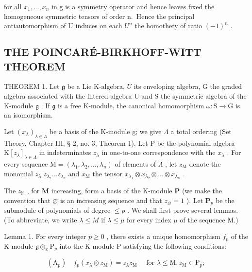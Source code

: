 for all \(x_{1},\ldots,x_{n}\) in g is a symmetry operator and hence leaves fixed the homogeneous symmetric tensors of order n.~Hence the principal antiautomorphism of U induces on each \(U^{n}\) the homothety of ratio \((-1)^{n}\) .

\subsection{THE POINCARÉ-BIRKHOFF-WITT THEOREM}

THEOREM 1. Let \(\mathfrak{g}\) be a Lie K-algebra, \(U\) its enveloping algebra, G the graded algebra associated with the filtered algebra U and S the symmetric algebra of the K-module \(\mathfrak{g}\) . If \(\mathfrak{g}\) is a free K-module, the canonical homomorphism \(\omega: \mathrm{S} \to \mathrm{G}\) is an isomorphism.

Let \((x_{\lambda})_{\lambda \in \Lambda}\) be a basis of the K-module g; we give \(\Lambda\) a total ordering (Set Theory, Chapter III, § 2, no. 3, Theorem 1). Let P be the polynomial algebra \(\mathrm{K}[z_{\lambda}]_{\lambda \in \Lambda}\) in indeterminates \(z_{\lambda}\) in one-to-one correspondence with the \(x_{\lambda}\) . For every sequence \(\mathrm{M} = (\lambda_1, \lambda_2, \ldots, \lambda_n)\) of elements of \(\Lambda\) , let \(z_{\mathrm{M}}\) denote the monomial \(z_{\lambda_1}z_{\lambda_2}\ldots z_{\lambda_n}\) and \(x_{\mathrm{M}}\) the tensor \(x_{\lambda_1}\otimes x_{\lambda_2}\otimes \dots \otimes x_{\lambda_n}\) .

The \(z_{\mathbb{M}}\) , for \(\mathbf{M}\) increasing, form a basis of the K-module \(\mathbf{P}\) (we make the convention that \(\varnothing\) is an increasing sequence and that \(z_{\varnothing} = 1\) ). Let \(\mathbf{P}_p\) be the submodule of polynomials of degree \(\leqslant p\) . We shall first prove several lemmas. (To abbreviate, we write \(\lambda \leqslant M\) if \(\lambda \leqslant \mu\) for every index \(\mu\) of the sequence M.)

Lemma 1. For every integer \(p \geqslant 0\) , there exists a unique homomorphism \(f_p\) of the K-module \(\mathfrak{g} \otimes_{\mathbb{K}} \mathrm{P}_p\) into the K-module \(\mathrm{P}\) satisfying the following conditions:

\[
\left(\mathrm{A} _ {p}\right) \quad f _ {p} \left(x _ {\lambda} \otimes z _ {\mathrm{M}}\right) = z _ {\lambda} z _ {\mathrm{M}} \quad \text {   for   } \lambda \leqslant \mathrm{M}, z _ {\mathrm{M}} \in \mathrm{P} _ {p};
\]


